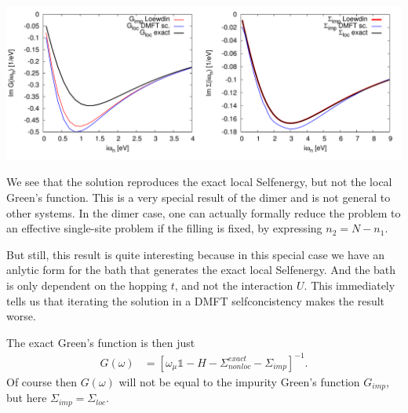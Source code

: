 \documentclass[12pt,a4paper]{scrartcl}
\numberwithin{equation}{section}
\newcommand{\unity}{\mathds{1}}
\begin{document}
\includegraphics[width=1\textwidth]{figs/reversebath/gimp_simp_dimer_loewdin.pdf}

We see that the solution reproduces the exact local Selfenergy, but not the local Green's function. 
This is a very special result of the dimer and is not general to other systems.
In the dimer case, one can actually formally reduce the problem to an effective single-site
problem if the filling is fixed, by expressing $n_2=N-n_1$.

But still, this result is quite interesting because in this special case we have an anlytic form 
for the bath that generates the exact local Selfenergy. And the bath is only dependent on the hopping
$t$, and not the interaction $U$.
This immediately tells us that iterating the solution in a DMFT selfconcistency makes the result worse.

The exact Green's function is then just
\begin{align}
 G(\omega) &= \left[ \omega_{\mu}\unity - H - \Sigma^{exact}_{nonloc} - \Sigma_{imp}  \right]^{-1}.
\end{align}
Of course then $G(\omega)$ will not be equal to the impurity Green's function $G_{imp}$, but here $\Sigma_{imp}=\Sigma_{loc}$.

\bigskip
\end{document}
